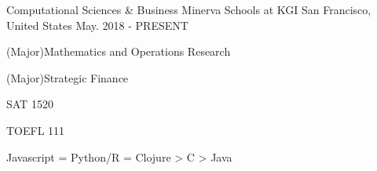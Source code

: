 \begin{cventries}
  \cventry
    {Computational Sciences \& Business}
    {Minerva Schools at KGI}
    {San Francisco, United States}
    {May. 2018 - PRESENT}
    {
      \begin{cvitems}
        \item {(Major)Mathematics and Operations Research}
        \item {(Major)Strategic Finance}
        \item {SAT 1520}
        \item {TOEFL 111}
        \item {Javascript = Python/R = Clojure > C > Java}
      \end{cvitems}
    }
\end{cventries}
